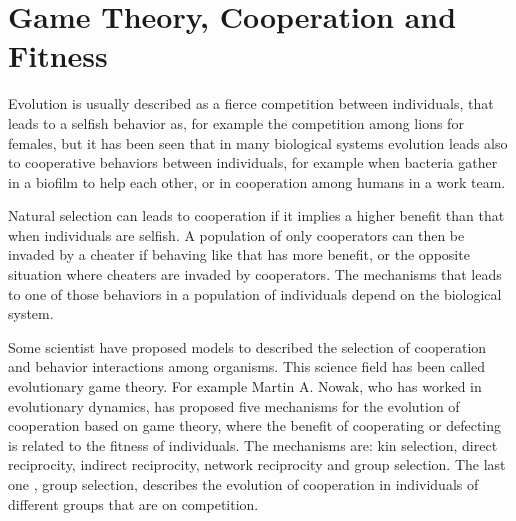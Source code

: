 \chapter{Game Theory, Cooperation and Fitness}
\ifpdf
    \graphicspath{{GameTheory/Figs/PNG/}{GameTheory/Figs/PDF/}{GameTheory/Figs/}}
\else
    \graphicspath{{GameTheory/Figs/EPS/}{GameTheory/Figs/}}
\fi
 Evolution is usually described as a fierce competition between individuals, that leads to a selfish behavior as, for example  the competition among lions for females, but it has been seen that in many biological systems evolution leads also to cooperative behaviors between individuals\cite{Dunny2008}, for example when bacteria gather in a biofilm to help each other, or in cooperation among humans in a work team. 

Natural selection can leads to cooperation if it  implies a higher benefit than that when individuals are selfish. A population of only cooperators can then be invaded by a cheater if behaving like that has more benefit, or the opposite situation where cheaters are invaded by cooperators. The mechanisms that leads to one of those behaviors in a population of individuals depend on the biological system.   

Some scientist have proposed models to described the selection of cooperation and behavior interactions among organisms. This science field has been called evolutionary game theory. For example  Martin A. Nowak,  who has worked in evolutionary dynamics,  has proposed five mechanisms for the evolution of cooperation based on  game theory, where the benefit of cooperating or defecting is related to the fitness of individuals\cite{Nowak2011,Shoresh2011}. The mechanisms are: kin selection, direct reciprocity, indirect reciprocity, network reciprocity and group selection. The last one , group selection, describes the evolution of cooperation in individuals of different groups that are on competition.



